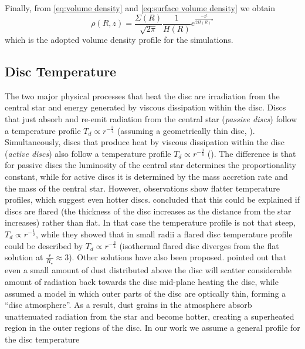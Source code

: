 \documentclass[aps,prb,twocolumn,superscriptaddress,floatfix,longbibliography]{revtex4-2}
\begin{document}
Finally, from \eqref{eq:volume density} and \eqref{eq:surface volume density} we obtain 
 \begin{equation}\label{eq:volume density extended}
     \rho (R,z) = \frac{\Sigma(R)}{\sqrt{2 \pi}} \frac{1}{H(R)} e^{\frac{-z^2}{2H(R)^2}}
 \end{equation}
which is the adopted volume density profile for the simulations.

\subsection{Disc Temperature}
The two major physical processes that heat the disc are irradiation from the central star and energy generated by viscous dissipation within the disc. Discs that just absorb and re-emit radiation from the central star ({\it passive discs}) follow a temperature profile $T_{d} \propto r^{-\frac{3}{4}}$ (assuming a geometrically thin disc, \cite{armitage2020astrophysics,adams1986infrared}). Simultaneously, discs that produce heat by viscous dissipation within the disc ({\it active discs}) also follow a temperature profile $T_{d} \propto r^{-\frac{3}{4}}$ (\cite{friedjung1985accretion}). The difference is that for passive discs the luminosity of the central star determines the proportionality constant, while for active discs it is determined by the mass accretion rate and the mass of the central star. However, observations show flatter temperature profiles, which suggest even hotter discs. \cite{kenyon1987spectral} concluded that this could be explained if discs are flared (the thickness of the disc increases as the distance from the star increases) rather than flat. In that case the temperature profile is not that steep, $T_{d} \propto r^{-\frac{1}{2}}$, while they showed that in small radii a flared disc temperature profile could be described by $T_{d} \propto r^{-\frac{3}{4}}$ (isothermal flared disc diverges from the flat solution at $\frac{r}{R_{\star}} \approx 3$). Other solutions have also been proposed. \cite{natta1993temperature} pointed out that even a small amount of dust  distributed above the disc will scatter considerable amount of radiation back towards the disc mid-plane heating the disc, while \cite{chiang1997spectral} assumed a model in which outer parts of the disc are optically thin, forming a ``disc atmosphere''. As a result, dust grains in the atmosphere absorb unattenuated radiation from the star and become hotter, creating a superheated region in the outer regions of the disc. In our work we assume a general profile for the disc temperature
\end{document}
